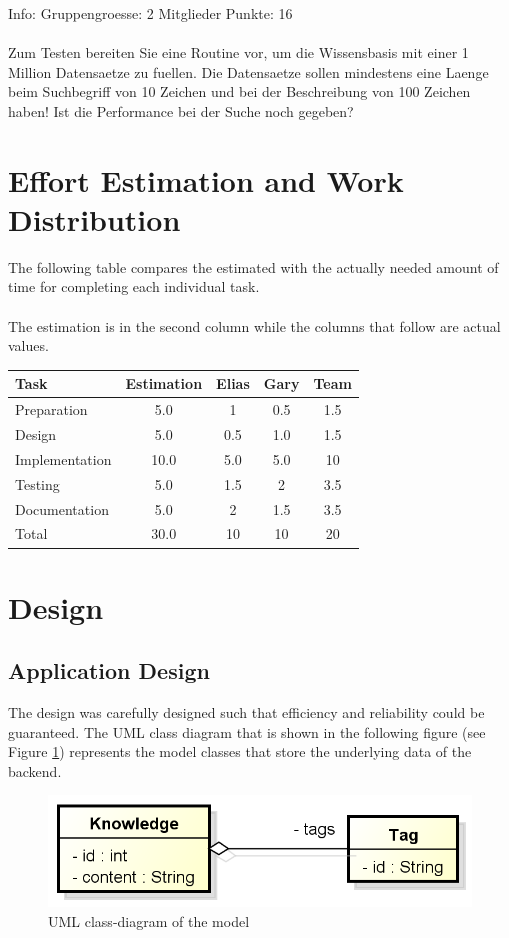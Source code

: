\documentclass[11pt, a4paper]{article}
\begin{document}
Info: Gruppengroesse: 2 Mitglieder Punkte: 16
\\\\
Zum Testen bereiten Sie eine Routine vor, um die Wissensbasis mit einer 1
Million Datensaetze zu fuellen. Die Datensaetze sollen mindestens eine Laenge
beim Suchbegriff von 10 Zeichen und bei der Beschreibung von 100 Zeichen haben!
Ist die Performance bei der Suche noch gegeben?

\section{Effort Estimation and Work Distribution}

The following table compares the estimated with the actually needed
amount of time for completing each individual task.
\\\\
The estimation is in the second column while the columns that follow
are actual values.

\parskip 12pt
\begin{tabular} {| l | c | c | c | c |}
	\hline
	Task & Estimation & Elias & Gary & Team	\\ \hline \hline
	Preparation & 5.0 & 1 &  0.5 & 1.5		\\ \hline
	Design & 5.0  & 0.5 &	1.0  & 1.5			\\ \hline
	Implementation & 10.0 & 5.0 & 5.0 & 10 \\ \hline
	Testing & 5.0	& 1.5	& 2 & 3.5 \\ \hline
	Documentation	& 5.0 & 2 & 1.5 & 3.5	\\ \hline 
	Total	& 30.0	& 10 & 10 & 20 \\
	\hline
\end{tabular}

\section{Design}

\subsection{Application Design}

The design was carefully designed such that efficiency and reliability could be
guaranteed. The UML class diagram that is shown in the following figure (see
Figure \ref{fig:uml}) represents the model classes that store the underlying
data of the backend. 

\begin{figure}[h!]
	\centering
	\includegraphics[width=5in]{img/uml}
	\caption{UML class-diagram of the model}
	\label{fig:uml}
\end{figure}
\end{document}
